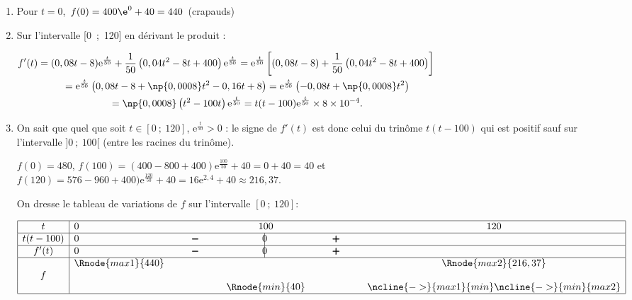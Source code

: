 \begin{enumerate}
\item 
Pour $t = 0$,\, $f(0) = 400 \e^{0} + 40 = 440$~(crapauds)
\item 



Sur l'intervalle [0~;~120] en dérivant le produit :

$\begin{gathered}f'(t) = (0,08t - 8)\text{e}^{\frac{t}{50}} + \dfrac{1}{50}\left(0,04t^2 - 8t + 400\right)\text{e}^{\frac{t}{50}} = \text{e}^{\frac{t}{50}}\left[(0,08t - 8) + \dfrac{1}{50}\left(0,04t^2 - 8t + 400\right)\right]\\
\phantom{f'(t)} 
= \text{e}^{\frac{t}{50}}\left(0,08t - 8 + \np{0,0008}t^2 - 0,16 t + 8 \right)
= \text{e}^{\frac{t}{50}}\left(-0,08t + \np{0,0008}t^2\right) \\
\phantom{f'(t)} 
= \np{0,0008}\left(t^2 - 100t\right)\text{e}^{\frac{t}{50}} 
= t(t - 100)\text{e}^{\frac{t}{50}} \times 8 \times 10^{-4}.\end{gathered}$



\item 
On sait que quel que soit $t \in [0~;~120]$, $\text{e}^{\frac{t}{50}} > 0$ : le signe de $f'(t)$ est donc celui du trinôme $t(t - 100)$ qui est positif sauf sur l'intervalle $]0~;~100[$ (entre les racines du trinôme). 

$f(0) = 480$, $f(100) = (400 - 800 + 400)\text{e}^{\frac{100}{50}}  + 40 = 0 + 40 = 40$ et \\
$f(120) = 576  - 960 + 400)\text{e}^{\frac{120}{50}} + 40 = 16 \text{e}^{2,4} + 40 \approx 216,37$.

On dresse le tableau de variations de $f$ sur l'intervalle $[0~;~120]$:

\begin{center}
{\renewcommand{\arraystretch}{1.3}
\def\esp{\hspace*{1.5cm}}
\def\hauteur{0pt}
$\begin{array}{|c|l *3{c} c|}
\hline
 t & 0 & \esp & 100 & \esp & 120 \\
 \hline
t(t-100) & 0 &  \pmb{-} & \vline\hspace{-2.7pt}0 & \pmb{+} & \\  
 \hline
f'(t) &  0 &  \pmb{-} & \vline\hspace{-2.7pt}0 & \pmb{+} & \\  
\hline
  & \Rnode{max1}{440}  &  &  &  & \Rnode{max2}{216,37}   \\
f & &  & & &  \rule{0pt}{\hauteur} \\
 &  & &   \Rnode{min}{40} & & \rule{0pt}{\hauteur}
\ncline{->}{max1}{min} \ncline{->}{min}{max2}\\
\hline
\end{array}$
}
\end{center}



\end{enumerate}

